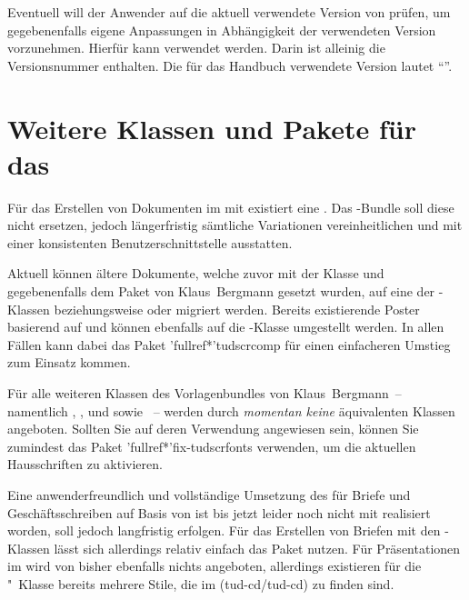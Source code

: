 \begin{Entity}{}
\begin{Declaration}
\begin{Declaration}
Eventuell will der Anwender auf die aktuell verwendete Version von \TUDScript 
prüfen, um gegebenenfalls eigene Anpassungen in Abhängigkeit der verwendeten 
Version vorzunehmen. Hierfür kann  verwendet 
werden. Darin ist alleinig die Versionsnummer enthalten. Die für das Handbuch 
verwendete Version lautet \enquote{\TUDScriptVersionNumber{}}.
\end{Declaration}
\end{Declaration}
\end{Entity}



\section{Weitere Klassen und Pakete für das \CD}
%
Für das Erstellen von Dokumenten im \TUDCD mit  existiert eine 
. Das \TUDScript-Bundle soll diese nicht ersetzen, 
jedoch längerfristig sämtliche Variationen vereinheitlichen und mit einer 
konsistenten Benutzerschnittstelle ausstatten. 

Aktuell können ältere Dokumente, welche zuvor mit der Klasse  
und gegebenenfalls dem Paket  von Klaus~Bergmann gesetzt 
wurden, auf eine der \TUDScript-Klassen  beziehungsweise 
 oder  migriert werden. Bereits 
existierende Poster basierend auf  und  
können ebenfalls auf die \TUDScript-Klasse  umgestellt 
werden. In allen Fällen kann dabei das Paket \Package'fullref*'{tudscrcomp} für 
einen einfacheren Umstieg zum Einsatz kommen. 

Für alle weiteren Klassen des Vorlagenbundles von Klaus~Bergmann~-- namentlich 
, ,  und  
sowie ~-- werden durch \TUDScript \emph{momentan keine} 
äquivalenten Klassen angeboten. Sollten Sie auf deren Verwendung angewiesen 
sein, können Sie zumindest das Paket \Package'fullref*'{fix-tudscrfonts} 
verwenden, um die aktuellen Hausschriften zu aktivieren.

Eine anwenderfreundlich und vollständige Umsetzung des \CDs für Briefe und 
Geschäftsschreiben auf Basis von \KOMAScript ist bis jetzt leider noch nicht 
mit \TUDScript realisiert worden, soll jedoch langfristig erfolgen. Für das 
Erstellen von Briefen mit den \TUDScript-Klassen lässt sich allerdings relativ 
einfach das Paket  nutzen. Für Präsentationen im \TUDCD wird 
von \TUDScript bisher ebenfalls nichts angeboten, allerdings existieren für die 
"~Klasse bereits mehrere Stile, die im \GitHubRepo(tud-cd/tud-cd) 
zu finden sind. 
